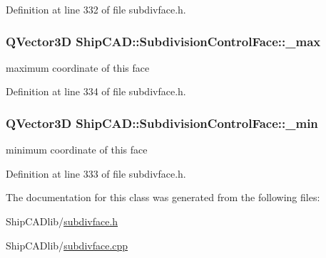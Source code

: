Definition at line 332 of file subdivface.\-h.

\hypertarget{classShipCAD_1_1SubdivisionControlFace_a22411574593283209772872bc740535b}{
\subsubsection[{\-\_\-max}]{\setlength{\rightskip}{0pt plus 5cm}Q\-Vector3\-D Ship\-C\-A\-D\-::\-Subdivision\-Control\-Face\-::\-\_\-max\hspace{0.3cm}{\ttfamily [protected]}}}\label{classShipCAD_1_1SubdivisionControlFace_a22411574593283209772872bc740535b}
maximum coordinate of this face 

Definition at line 334 of file subdivface.\-h.

\hypertarget{classShipCAD_1_1SubdivisionControlFace_aac4f577da0f5203059901c5e09814e1d}{
\subsubsection[{\-\_\-min}]{\setlength{\rightskip}{0pt plus 5cm}Q\-Vector3\-D Ship\-C\-A\-D\-::\-Subdivision\-Control\-Face\-::\-\_\-min\hspace{0.3cm}{\ttfamily [protected]}}}\label{classShipCAD_1_1SubdivisionControlFace_aac4f577da0f5203059901c5e09814e1d}
minimum coordinate of this face 

Definition at line 333 of file subdivface.\-h.



The documentation for this class was generated from the following files\-:\begin{DoxyCompactItemize}
\item 
Ship\-C\-A\-Dlib/\hyperlink{subdivface_8h}{subdivface.\-h}\item 
Ship\-C\-A\-Dlib/\hyperlink{subdivface_8cpp}{subdivface.\-cpp}\end{DoxyCompactItemize}
